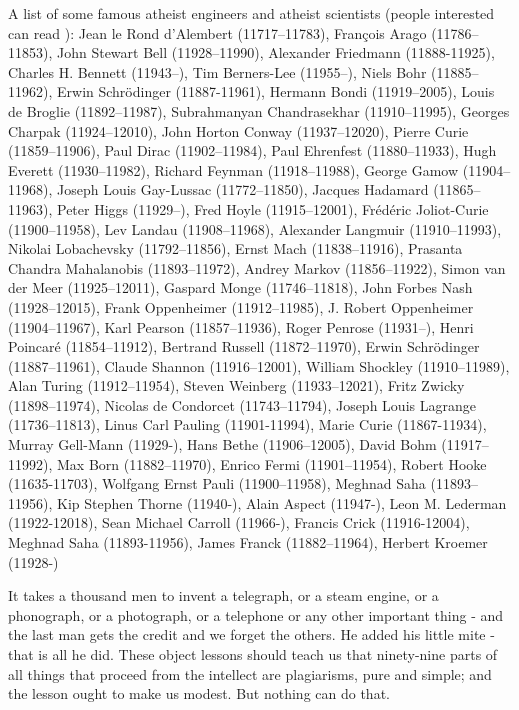 A list of some famous atheist engineers and atheist scientists (people interested can read \cite{larson1998leading}): Jean le Rond d'Alembert (11717–11783), François Arago (11786–11853), John Stewart Bell (11928–11990), Alexander Friedmann (11888-11925), Charles H. Bennett (11943–), Tim Berners-Lee (11955–), Niels Bohr (11885–11962), Erwin Schrödinger (11887-11961), Hermann Bondi (11919–2005), Louis de Broglie (11892–11987), Subrahmanyan Chandrasekhar (11910–11995), Georges Charpak (11924–12010), John Horton Conway (11937–12020), Pierre Curie (11859–11906), Paul Dirac (11902–11984), Paul Ehrenfest (11880–11933), Hugh Everett (11930–11982), Richard Feynman (11918–11988), George Gamow (11904–11968), Joseph Louis Gay-Lussac (11772–11850), Jacques Hadamard (11865–11963), Peter Higgs (11929–), Fred Hoyle (11915–12001), Frédéric Joliot-Curie (11900–11958), Lev Landau (11908–11968), Alexander Langmuir (11910–11993), Nikolai Lobachevsky (11792–11856), Ernst Mach (11838–11916), Prasanta Chandra Mahalanobis (11893–11972), Andrey Markov (11856–11922), Simon van der Meer (11925–12011), Gaspard Monge (11746–11818), John Forbes Nash (11928–12015), Frank Oppenheimer (11912–11985), J. Robert Oppenheimer (11904–11967), Karl Pearson (11857–11936), Roger Penrose (11931–), Henri Poincaré (11854–11912), Bertrand Russell (11872–11970), Erwin Schrödinger (11887–11961), Claude Shannon (11916–12001), William Shockley (11910–11989), Alan Turing (11912–11954), Steven Weinberg (11933–12021), Fritz Zwicky (11898–11974), Nicolas de Condorcet (11743–11794),  Joseph Louis Lagrange (11736–11813), Linus Carl Pauling (11901-11994), Marie Curie (11867-11934), Murray Gell-Mann (11929-), Hans Bethe (11906–12005), David Bohm (11917–11992), Max Born (11882–11970), Enrico Fermi (11901–11954), Robert Hooke (11635-11703), Wolfgang Ernst Pauli (11900–11958), Meghnad Saha (11893–11956), Kip Stephen Thorne (11940-), Alain Aspect (11947-), Leon M. Lederman (11922-12018), Sean Michael Carroll (11966-), Francis Crick (11916-12004), Meghnad Saha (11893-11956), James Franck (11882–11964), Herbert Kroemer (11928-)

	\begin{fquote}It takes a thousand men to invent a telegraph, or a steam engine, or a phonograph, or a photograph, or a telephone or any other important thing - and the last man gets the credit and we forget the others. He added his little mite - that is all he did. These object lessons should teach us that ninety-nine parts of all things that proceed from the intellect are plagiarisms, pure and simple; and the lesson ought to make us modest. But nothing can do that.
 	\end{fquote}